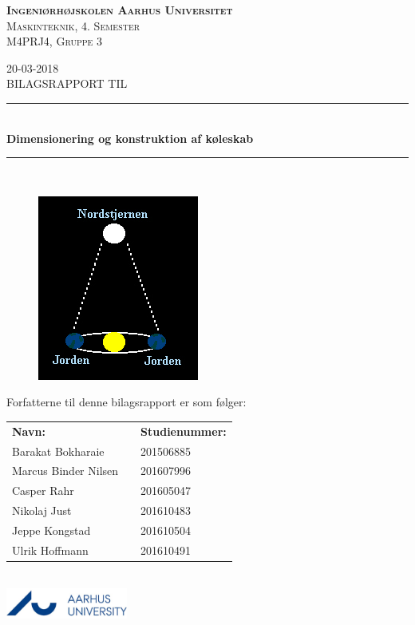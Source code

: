 \documentclass[../Hovedrapport.tex]{subfiles}
\begin{document}
\thispagestyle{empty}
    \newcommand{\HRule}{\rule{\linewidth}{0.5mm}}
    \center %
    \textsc{\LARGE \textbf{Ingeniørhøjskolen Aarhus Universitet}}   \\  [0.5cm]
    \textsc{\Large Maskinteknik, 4. Semester}                       \\  [0.5cm]
    \textsc{\large M4PRJ4, Gruppe 3}                                \\  [0.5cm]
        \date{20-03-2018}
    {\large 20-03-2018}                                             \\  [0.5cm]
    \textsc{\LARGE BILAGSRAPPORT TIL}\\[0.5cm]
    \HRule \\[0.4cm]
    \textbf{{\huge Dimensionering og konstruktion af køleskab}}\\[0.1cm]
    \HRule \\[0.001cm]
    
    \begin{minipage}{1\textwidth}	
    \begin{figure}[H]
			\centering
			\includegraphics[width=0.3\linewidth]{Billeder/Forsidebillede.jpg}
			\label{fig:Forsidebillede}
		\end{figure}
Forfatterne til denne bilagsrapport er som følger:
\begin{table}[H]
	\begin{tabular}{lll}
	\textbf{Navn:}          & &   \textbf{Studienummer:}      \\
	Barakat Bokharaie       & &   201506885                   \\
	Marcus Binder Nilsen    & &   201607996                   \\
	Casper Rahr             & &   201605047                   \\
	Nikolaj Just            & &   201610483                   \\
	Jeppe Kongstad          & &   201610504                   \\
	Ulrik Hoffmann          & &   201610491                   \\
	\end{tabular}
\end{table}
    \end{minipage} \\
    	\includegraphics[width=0.3\textwidth]{Billeder/AUlogo.JPG}
    \vfil
\end{document}
